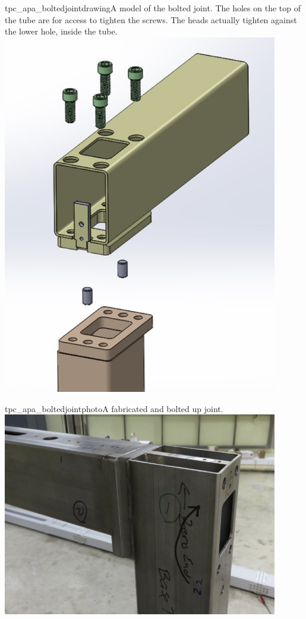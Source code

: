 \begin{cdrfigure}{tpc_apa_boltedjointdrawing}{A model of the bolted joint.  The holes on the top of the tube are for access to tighten the screws.  The heads actually tighten against the lower hole, inside the tube.}
\includegraphics[width=0.9\textwidth]{figures/tpc_apa_boltedjointdrawing.png} 
\end{cdrfigure}

\begin{cdrfigure}{tpc_apa_boltedjointphoto}{A fabricated and bolted up joint.}
\includegraphics[width=0.9\textwidth]{figures/tpc_apa_boltedjointphoto.png} 
\end{cdrfigure}

